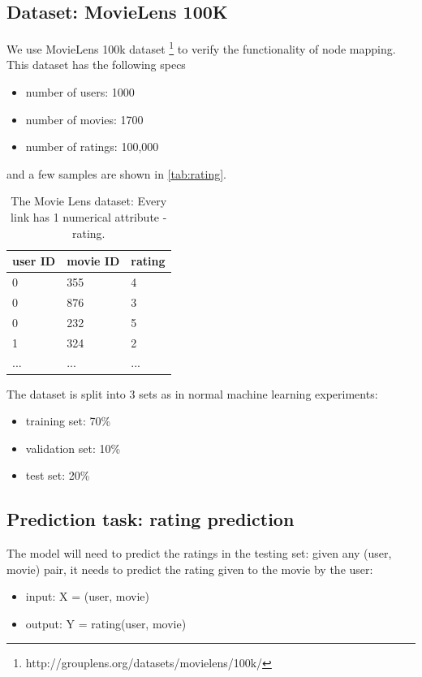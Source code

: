 \documentclass{article}
\begin{document}
\subsection{Dataset: MovieLens 100K}
We use MovieLens 100k dataset \cite{harper2015movielens} 
\footnote{http://grouplens.org/datasets/movielens/100k/} to verify the 
functionality of node mapping. This dataset has the following specs
\begin{itemize}
	\item number of users: 1000
	\item number of movies: 1700
	\item number of ratings: 100,000
\end{itemize}
and a few samples are shown in \autoref{tab:rating}.
\begin{table}[h]
	\centering
	\begin{tabularx}{0.5\textwidth}{ |X|X|X| }  \hline
		user ID & movie ID & rating \\ \hline
		0 & 355 & 4 \\ \hline
		0 & 876 & 3 \\ \hline
		0 & 232 & 5 \\ \hline
		1 & 324 & 2 \\ \hline
		... & ... & ... \\ \hline
	\end{tabularx}
	\caption{The Movie Lens dataset: Every link has 1 numerical attribute - 
	rating.}
	\label{tab:rating}
\end{table}
The dataset is split into 3 sets as in normal machine learning experiments:
\begin{itemize}
	\item training set: 70\%
	\item validation set: 10\%
	\item test set: 20\%
\end{itemize}

\subsection{Prediction task: rating prediction}
The model will need to predict the ratings in the testing set: given any (user, 
movie) pair, it needs to predict the rating given to the movie by the user:
\begin{itemize}
	\item input: X = (user, movie)
	\item output: Y = rating(user, movie)
\end{itemize}
\end{document}
